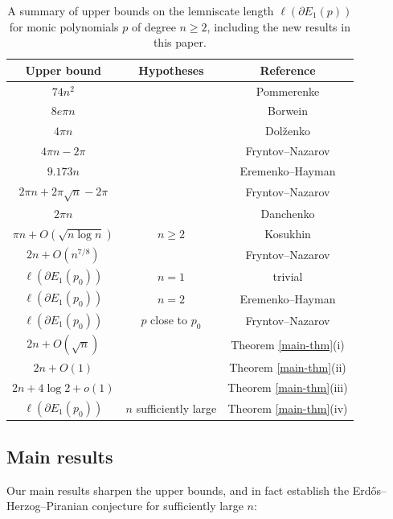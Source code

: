 \documentclass[12pt]{amsart}
\begin{document}
\begin{table}[ht]
\begin{tabular}{|c|c|c|}
\hline
Upper bound & Hypotheses & Reference \\
\hline
$74 n^2$ && Pommerenke \cite{pommerenke61}\\
$8e\pi n$ && Borwein \cite{borwein} \\
$4\pi n$ && Dol\v{z}enko \cite{dolzenko} \\
$4\pi n - 2\pi$ && Fryntov--Nazarov \cite[\S 7]{fryntov} \\
$9.173 n$ && Eremenko--Hayman \cite{eremenko} \\
$2\pi n + 2\pi \sqrt{n} - 2\pi$ && Fryntov--Nazarov \cite[\S 8]{fryntov} \\
$2\pi n$ && Danchenko \cite{danchenko} \\
$\pi n + O(\sqrt{n \log n})$ & $n \geq 2$ & Kosukhin \cite[Theorem 3]{kosukhin} \\
\hline
$2n + O(n^{7/8})$ && Fryntov--Nazarov \cite[\S 9]{fryntov}\\
$\ell(\partial E_1(p_0))$ &$n=1$ & trivial\\
$\ell(\partial E_1(p_0))$ &$n=2$ & Eremenko--Hayman \cite{eremenko} \\
$\ell(\partial E_1(p_0))$ &$p$ close to $p_0$ & Fryntov--Nazarov \cite[\S 6]{fryntov}\\
\hline
$2n + O(\sqrt{n})$ && Theorem \ref{main-thm}(i) \\
$2n + O(1)$ && Theorem \ref{main-thm}(ii) \\
$2n + 4 \log 2 + o(1)$ && Theorem \ref{main-thm}(iii) \\
$\ell(\partial E_1(p_0))$ & $n$ sufficiently large & Theorem \ref{main-thm}(iv) \\
\hline
\end{tabular}
\caption{A summary of upper bounds on the lemniscate length $\ell(\partial E_1(p))$ for monic polynomials $p$ of degree $n \geq 2$, including the new results in this paper.}\label{results-table}
\end{table}

\subsection{Main results}

Our main results sharpen the upper bounds, and in fact establish the Erd\H{o}s--Herzog--Piranian conjecture for sufficiently large $n$:
\end{document}
